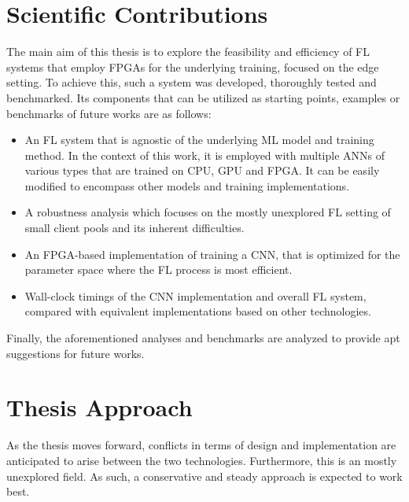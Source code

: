 \section{Scientific Contributions}
The main aim of this thesis is to explore the feasibility and efficiency of FL systems that employ FPGAs for the underlying training, focused on the edge setting. To achieve this, such a system was developed, thoroughly tested and benchmarked. Its components that can be utilized as starting points, examples or benchmarks of future works are as follows:
\begin{itemize}
    \item An FL system that is agnostic of the underlying ML model and training method. In the context of this work, it is employed with multiple ANNs of various types that are trained on CPU, GPU and FPGA. It can be easily modified to encompass other models and training implementations.
    \item A robustness analysis which focuses on the mostly unexplored FL setting of small client pools and its inherent difficulties.
    \item An FPGA-based implementation of training a CNN, that is optimized for the parameter space where the FL process is most efficient.
    \item Wall-clock timings of the CNN implementation and overall FL system, compared with equivalent implementations based on other technologies.
\end{itemize}
Finally, the aforementioned analyses and benchmarks are analyzed to provide apt suggestions for future works.

\section{Thesis Approach}
As the thesis moves forward, conflicts in terms of design and implementation are anticipated to arise between the two technologies. Furthermore, this is an mostly unexplored field. As such, a conservative and steady approach is expected to work best. 

